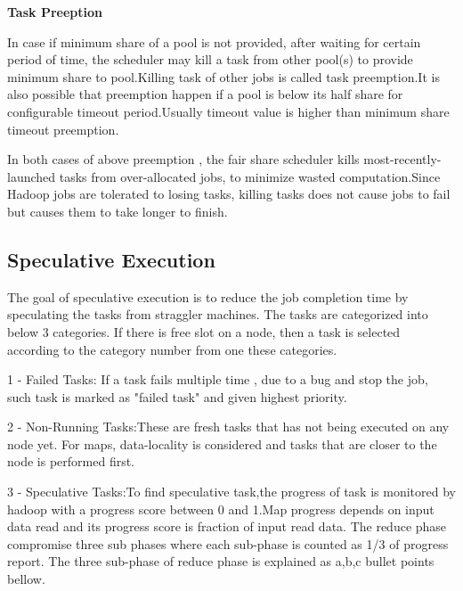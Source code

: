  
 \textbf{Task Preeption}
 
 In case if minimum share of a pool is not provided, after waiting for certain period of time, the scheduler may kill a task from other pool(s) to provide minimum share to pool.Killing task of other jobs is called task preemption.It is also possible that preemption happen if a pool is below its half share for configurable timeout period.Usually timeout value is higher than minimum share timeout preemption.\cite{fair} \cite{fairw} 
 
In both cases of above preemption , the fair share scheduler kills most-recently-launched tasks from over-allocated jobs, to minimize wasted computation.Since Hadoop jobs are tolerated to losing tasks, killing tasks does not cause jobs to fail but causes them to take longer to finish.\cite{fair}\cite{fairw} 
 














\subsection{Speculative Execution}

The goal of speculative execution is to reduce the job completion time by speculating the tasks from straggler machines. The tasks are categorized into below 3 categories. If there is free slot on a node, then a task is selected according to the category number from one these categories.  

1 - Failed Tasks: If a task fails multiple time , due to a bug and stop the job, such task is marked as "failed task" and given highest priority. 

2 - Non-Running Tasks:These are fresh tasks that has not being executed on any node yet. For maps, data-locality is considered and tasks that are closer to the node is performed first. 

3 - Speculative Tasks:To find speculative task,the progress of task is monitored by hadoop with a progress score between 0 and 1.Map progress depends on input data read and its progress score is fraction of input read data. The reduce phase compromise three sub phases where each sub-phase is counted as 1/3 of progress report. The three sub-phase of reduce phase is explained as a,b,c bullet points bellow. 

